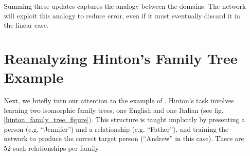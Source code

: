 \documentclass[10pt,letterpaper]{article}
\begin{document}
Summing these updates captures the analogy between the domains. The network will exploit this analogy to reduce error, even if it must eventually discard it in the linear case. \par %
\section{Reanalyzing Hinton's Family Tree Example}
Next, we briefly turn our attention to the example of \citet{Hinton1986}. Hinton's task involves learning two isomorphic family trees, one English and one Italian (see fig. \ref{hinton_family_tree_figure}). This structure is taught implicitly by presenting a person (e.g. ``Jennifer'') and a relationship (e.g. ``Father''), and training the network to produce the correct target person (``Andrew'' in this case). There are 52 such relationships per family. \par
\end{document}
